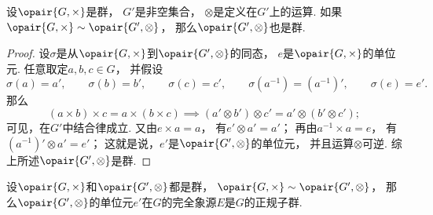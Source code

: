 \begin{theorem}\label{theorem:抽象代数.群的同态象是群}
设\(\opair{G,\times}\)是群，
\(G'\)是非空集合，
\(\otimes\)是定义在\(G'\)上的运算.
如果\(\opair{G,\times}\sim\opair{G',\otimes}\)，
那么\(\opair{G',\otimes}\)也是群.
\begin{proof}
设\(\sigma\)是从\(\opair{G,\times}\)到\(\opair{G',\otimes}\)的同态，
\(e\)是\(\opair{G,\times}\)的单位元.
任意取定\(a,b,c\in G\)，
并假设\[
	\sigma(a)=a', \qquad
	\sigma(b)=b', \qquad
	\sigma(c)=c', \qquad
	\sigma(a^{-1})=(a^{-1})', \qquad
	\sigma(e)=e'.
\]
那么\[
	(a \times b)\times c = a \times(b \times c)
	\implies
	(a' \otimes b')\otimes c' = a' \otimes(b' \otimes c');
\]
可见，在\(G'\)中结合律成立.
又由\(e\times a=a\)，
有\(e'\otimes a'=a'\)；
再由\(a^{-1}\times a=e\)，
有\((a^{-1})'\otimes a'=e'\)；
这就是说，\(e'\)是\(\opair{G',\otimes}\)的单位元，
并且运算\(\otimes\)可逆.
综上所述\(\opair{G',\otimes}\)是群.
\end{proof}
\end{theorem}

\begin{theorem}
设\(\opair{G,\times}\)和\(\opair{G',\otimes}\)都是群，
\(\opair{G,\times}\sim\opair{G',\otimes}\)，
那么\(\opair{G',\otimes}\)的单位元\(e'\)在\(G\)的完全象源\(E\)是\(G\)的正规子群.
\end{theorem}
